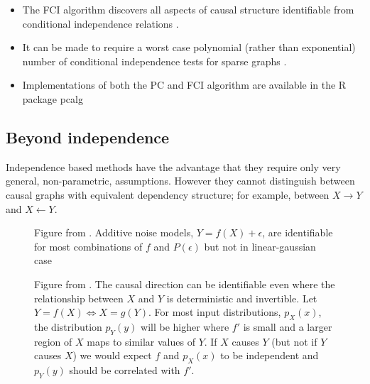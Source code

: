 \documentclass[a0,landscape,25pt,plainsections]{sciposter}
\begin{document}
\begin{multicols}{5}
\begin{itemize}
\item The FCI algorithm discovers all aspects of causal structure identifiable from conditional independence relations \cite{Zhang2008}.
\item It can be made to require a worst case polynomial (rather than exponential) number of conditional independence tests for sparse graphs \cite{Claassen2013}. 
\item Implementations of both the PC and FCI algorithm are available in the R package pcalg \cite{Kalisch2012}
\end{itemize}


\subsection*{Beyond independence}
Independence based methods have the advantage that they require only very general, non-parametric, assumptions. However they cannot distinguish between causal graphs with equivalent dependency structure; for example, between $X \rightarrow Y$ and $X \leftarrow Y$.


\begin{figure}
\centering
\caption{Figure from {\cite{Hoyer2009}}. Additive noise models, $Y = f(X)+\epsilon$, are identifiable for most combinations of $f$ and $P(\epsilon)$ but not in linear-gaussian case}
{}
\end{figure}

\begin{figure}
\centering
\caption{Figure from {\cite{Daniusis2010}}. The causal direction can be identifiable even where the relationship between $X$ and $Y$ is deterministic and invertible. Let $Y = f(X) \Leftrightarrow X = g(Y)$. For most input distributions, $p_{X}(x)$, the distribution $p_{Y}(y)$ will be higher where $f'$ is small and a larger region of $X$ maps to similar values of $Y$. If $X$ causes $Y$ (but not if $Y$ causes $X$) we would expect $f$ and $p_{X}(x)$ to be independent and $p_{Y}(y)$ should be correlated with $f'$.} 


\end{figure}
\end{multicols}
\end{document}

